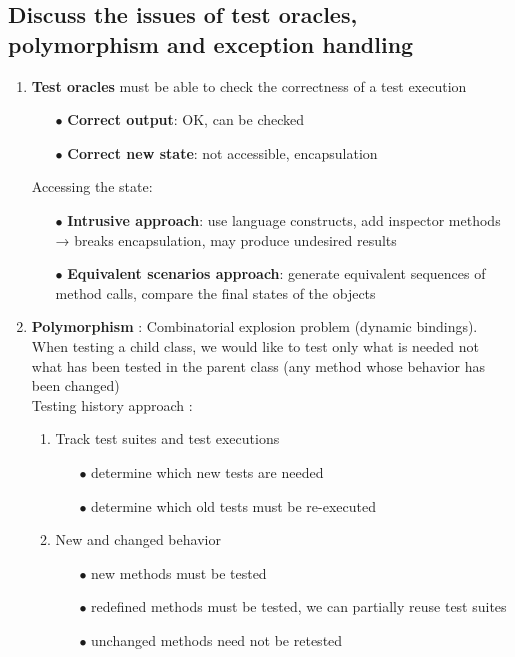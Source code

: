 \documentclass{article}
\begin{document}
\subsection{Discuss the issues of test oracles, polymorphism and exception handling}
\begin{enumerate}
    \item \textbf{Test oracles} must be able to check the correctness of a test execution
    \begin{itemize}
        \item [$\bullet$]\textbf{Correct output}: OK, can be checked

        \item [$\bullet$]\textbf{Correct new state}: not accessible, encapsulation
    \end{itemize}
    Accessing the state:
    \begin{itemize}
        \item [$\bullet$]\textbf{Intrusive approach}: use language constructs, add inspector methods → breaks encapsulation,
may produce undesired results
        \item [$\bullet$]\textbf{Equivalent scenarios approach}: generate equivalent sequences of method calls, compare the
final states of the objects\\
    \end{itemize}
    \item \textbf{Polymorphism} : Combinatorial explosion problem (dynamic bindings). When testing a child class, we would like to test only what is needed not what has been tested in the parent class (any method whose behavior has been changed)\\
Testing history approach : 
\begin{enumerate}
    \item Track test suites and test executions
    \begin{itemize}
        \item [$\bullet$]determine which new tests are needed
        \item [$\bullet$] determine which old tests must be re-executed
    \end{itemize}
    \item New and changed behavior
    \begin{itemize}
        \item [$\bullet$]new methods must be tested
        \item [$\bullet$]redefined methods must be tested, we can partially reuse test suites
        \item [$\bullet$]unchanged methods need not be retested


\end{itemize}
\end{enumerate}
\end{enumerate}
\end{document}
